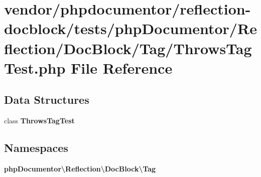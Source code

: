 \section{vendor/phpdocumentor/reflection-\/docblock/tests/php\+Documentor/\+Reflection/\+Doc\+Block/\+Tag/\+Throws\+Tag\+Test.php File Reference}
\label{_throws_tag_test_8php}
\subsection*{Data Structures}
\begin{DoxyCompactItemize}
\item 
class {\bf Throws\+Tag\+Test}
\end{DoxyCompactItemize}
\subsection*{Namespaces}
\begin{DoxyCompactItemize}
\item 
 {\bf php\+Documentor\textbackslash{}\+Reflection\textbackslash{}\+Doc\+Block\textbackslash{}\+Tag}
\end{DoxyCompactItemize}
